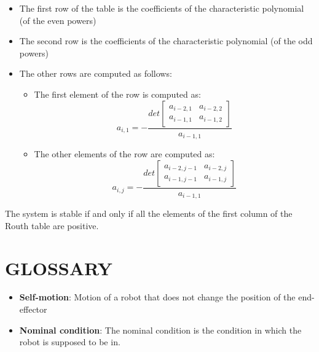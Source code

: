 \documentclass[a4paper,12pt]{article}
\begin{document}
        \begin{itemize}
            \item The first row of the table is the coefficients of the 
            characteristic polynomial (of the even powers)
            \item The second row is the coefficients of the characteristic
            polynomial (of the odd powers)
            \item The other rows are computed as follows:
            \begin{itemize}
                \item The first element of the row is computed as:
                \begin{equation}
                    a_{i,1} = -\frac{det\begin{bmatrix}
                        a_{i-2,1} & a_{i-2,2}\\
                        a_{i-1,1} & a_{i-1,2}
                    \end{bmatrix}}{a_{i-1,1}}
                \end{equation}
                \item The other elements of the row are computed as:
                \begin{equation}
                    a_{i,j} = -\frac{det\begin{bmatrix}
                        a_{i-2,j-1} & a_{i-2,j}\\
                        a_{i-1,j-1} & a_{i-1,j}
                    \end{bmatrix}}{a_{i-1,1}}
                \end{equation}
            \end{itemize}
        \end{itemize}
        The system is stable if and only if all the elements
         of the first column
        of the Routh table are positive.





\section{GLOSSARY}
\begin{itemize}
\item \textbf{Self-motion}: Motion of a robot that does 
not change the position of the end-effector
\label{glossary:self-motion}
\item \textbf{Nominal condition}: The nominal condition is the condition 
in which the robot is supposed to be in.
\label{glossary:nominal condition}
\end{itemize}
\end{document}
